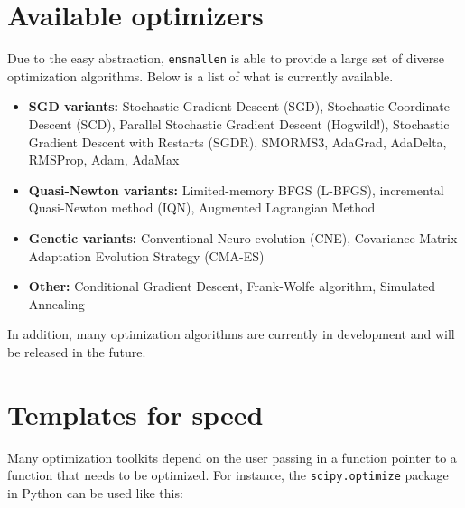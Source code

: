 \documentclass{article}
\begin{document}
\section{Available optimizers}
\vspace*{-0.5em}

Due to the easy abstraction, {\tt ensmallen} is able to provide a large set of
diverse optimization algorithms.  Below is a list of what is currently
available.

\vspace*{-0.4em}
\begin{itemize}
  \item {\bf SGD variants:} Stochastic Gradient Descent (SGD), Stochastic
      Coordinate Descent (SCD), Parallel Stochastic Gradient Descent (Hogwild!),
      Stochastic Gradient Descent with Restarts (SGDR), SMORMS3, AdaGrad,
      AdaDelta, RMSProp, Adam, AdaMax

  \item {\bf Quasi-Newton variants:} Limited-memory BFGS (L-BFGS), incremental
        Quasi-Newton method (IQN), Augmented Lagrangian Method

  \item {\bf Genetic variants:} Conventional Neuro-evolution (CNE), Covariance
        Matrix Adaptation Evolution Strategy (CMA-ES)

  \item {\bf Other:} Conditional Gradient Descent, Frank-Wolfe algorithm, Simulated Annealing

\end{itemize}
\vspace*{-0.4em}

In addition, many optimization algorithms are currently in development and will
be released in the future.

\vspace*{-0.3em}
\section{Templates for speed}
\vspace*{-0.5em}

Many optimization toolkits depend on the user passing in a function pointer to a
function that needs to be optimized.  For instance, the {\tt scipy.optimize}
package in Python can be used like this:
\end{document}
